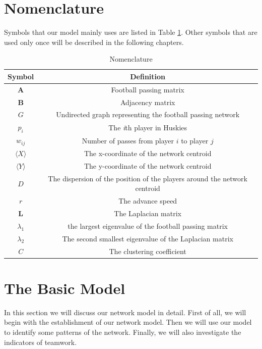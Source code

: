\documentclass{mcmthesis}
\begin{document}
\section{Nomenclature}
	Symbols that our model mainly uses are listed in Table \ref{tab:Nomen}.  Other symbols that are used only once will be described in the following chapters.
	\begin{table}
    	\centering
    	\caption{Nomenclature}
		\label{tab:Nomen}
		\begin{tabular}{c c}
			\hline	
				Symbol & Definition\\
			\hline
				$\textbf{A}$ & Football passing matrix\\
				$\textbf{B}$ & Adjacency matrix\\
				$G$ & Undirected graph representing the football passing network\\
				$p_{i}$ & The \emph{i}th player in Huskies\\
				$w_{ij}$ & Number of passes from player $i$ to player $j$\\
				$\langle$$X$$\rangle$ & The x-coordinate of the network centroid\\
				$\langle$$Y$$\rangle$ & The y-coordinate of the network centroid\\
				$D$ & The dispersion of the position of the players around the network centroid\\
				$r$ & The advance speed\\
				$\textbf{L}$ & The Laplacian matrix\\
				$\lambda_{1}$ & the largest eigenvalue of the football passing matrix\\
				$\lambda_{2}$ & The second smallest eigenvalue of the Laplacian matrix\\
				$C$ & The clustering coefficient\\
			\hline
   	 	\end{tabular}
	\end{table}

\section{The Basic Model}
	In this section we will discuss our network model in detail.  First of all, we will begin with the establishment of our network model.  Then we will use our model to identify some patterns of the network.  Finally, we will also investigate the indicators of teamwork. 
\end{document}
